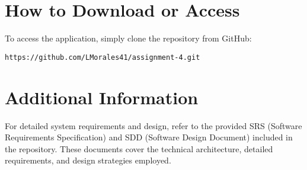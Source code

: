 \documentclass{article}
\begin{document}
\section{How to Download or Access}
To access the application, simply clone the repository from GitHub:
\begin{verbatim}
https://github.com/LMorales41/assignment-4.git
\end{verbatim}


\section{Additional Information}
For detailed system requirements and design, refer to the provided SRS (Software Requirements Specification) and SDD (Software Design Document) included in the repository. These documents cover the technical architecture, detailed requirements, and design strategies employed.
\end{document}
